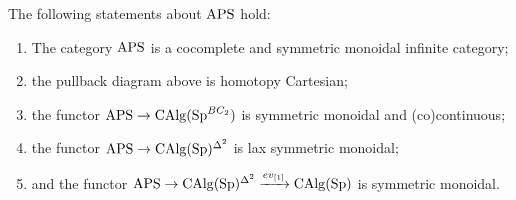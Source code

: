 \begin{theorem}
The following statements about $\mathrm{APS}$ hold:
\begin{enumerate}
\item The category $\mathrm{APS}$ is a cocomplete and symmetric monoidal infinite category;
\item the pullback diagram above is homotopy Cartesian;
\item the functor $\mathrm{APS}\to \operatorname{CAlg}(\operatorname{Sp}^{BC_2})$ is symmetric monoidal and (co)continuous;
\item the functor $\mathrm{APS}\to \operatorname{CAlg}(\operatorname{Sp})^{\Delta^2}$ is lax symmetric monoidal;
\item and the functor $\mathrm{APS}\to \operatorname{CAlg}(\operatorname{Sp})^{\Delta^2}\xrightarrow{ev_{[1]}} \operatorname{CAlg}(\operatorname{Sp})$ is symmetric monoidal.
\end{enumerate}
\end{theorem}
